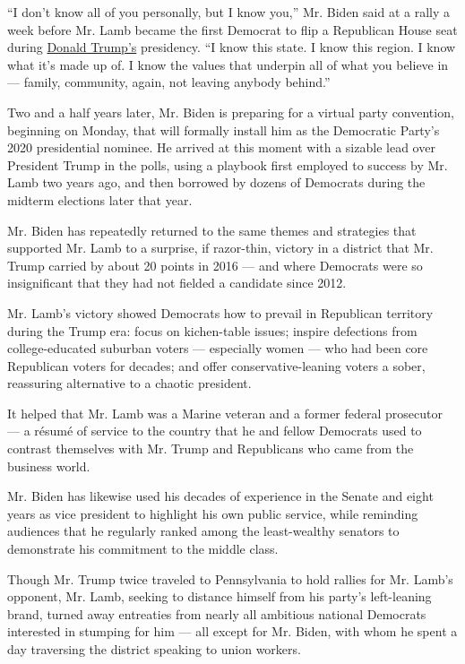 ``I don't know all of you personally, but I know you,'' Mr. Biden said
at a rally a week before Mr. Lamb became the first Democrat to flip a
Republican House seat during
\href{https://www.nytimes3xbfgragh.onion/2020/08/20/us/politics/trump-pennsylvania.html}{Donald
Trump's} presidency. ``I know this state. I know this region. I know
what it's made up of. I know the values that underpin all of what you
believe in --- family, community, again, not leaving anybody behind.''

Two and a half years later, Mr. Biden is preparing for a virtual party
convention, beginning on Monday, that will formally install him as the
Democratic Party's 2020 presidential nominee. He arrived at this moment
with a sizable lead over President Trump in the polls, using a playbook
first employed to success by Mr. Lamb two years ago, and then borrowed
by dozens of Democrats during the midterm elections later that year.

Mr. Biden has repeatedly returned to the same themes and strategies that
supported Mr. Lamb to a surprise, if razor-thin, victory in a district
that Mr. Trump carried by about 20 points in 2016 --- and where
Democrats were so insignificant that they had not fielded a candidate
since 2012.

Mr. Lamb's victory showed Democrats how to prevail in Republican
territory during the Trump era: focus on kichen-table issues; inspire
defections from college-educated suburban voters --- especially women
--- who had been core Republican voters for decades; and offer
conservative-leaning voters a sober, reassuring alternative to a chaotic
president.

It helped that Mr. Lamb was a Marine veteran and a former federal
prosecutor --- a résumé of service to the country that he and fellow
Democrats used to contrast themselves with Mr. Trump and Republicans who
came from the business world.

Mr. Biden has likewise used his decades of experience in the Senate and
eight years as vice president to highlight his own public service, while
reminding audiences that he regularly ranked among the least-wealthy
senators to demonstrate his commitment to the middle class.

Though Mr. Trump twice traveled to Pennsylvania to hold rallies for Mr.
Lamb's opponent, Mr. Lamb, seeking to distance himself from his party's
left-leaning brand, turned away entreaties from nearly all ambitious
national Democrats interested in stumping for him --- all except for Mr.
Biden, with whom he spent a day traversing the district speaking to
union workers.

